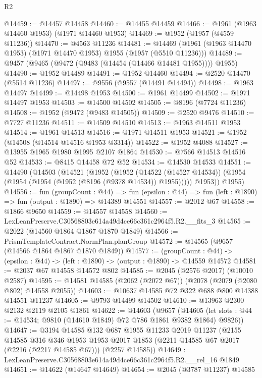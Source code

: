 \begin{lexlean}{R2}
\begin{coremodule}
@14459 := @14457 @14458
@14460 := @14455 @14459
@14466 := @1961 (@1963 @14460 @1953) (@1971 @14460 @1953)
@14469 := @1952 (@1957 (@4559 @11236))
@14470 := @4563 @11236
@14481 := @14469 (@1961 (@1963 @14470 @1953) (@1971 @14470 @1953) @1955 (@1957 (@5510 @11236)))
@14489 := @9457 (@9465 (@9472 (@9483 (@14454 (@14466 @14481 @1955)))) @1955)
@14490 := @1952 @14489
@14491 := @1952 @14460
@14494 := @2520 @14470 (@5514 @11236)
@14497 := @9556 (@9557 (@14491 @14494))
@14498 := @1963 @14497
@14499 := @14498 @1953
@14500 := @1961 @14499
@14502 := @1971 @14497 @1953
@14503 := @14500 @14502
@14505 := @8196 (@7724 @11236)
@14508 := @1952 (@9472 (@9483 @14505))
@14509 := @2520 @9476
@14510 := @7727 @11236
@14511 := @14509 @14510
@14513 := @1963 @14511 @1953
@14514 := @1961 @14513
@14516 := @1971 @14511 @1953
@14521 := @1952 (@14508 (@14514 @14516 @1953 @3314))
@14522 := @1952 @4088
@14527 := @13955 @1965 @1980 @1995 @2107 @1864
@14530 := @7566 @14513 @14516 @52
@14533 := @8415 @14458 @72 @52
@14534 := @14530 @14533
@14551 := @14490
    (@14503
      (@14521
        (@1952
          (@1952
            (@14522 (@14527 @14534))
            (@1954 (@1954 (@1954 (@1952 (@8196 (@9378 @14534)) @1955)))))
          @1953))
      @1955)
@14556 := fun (groupCount : @44) =>
  fun (epsilon : @44) => fun (left : @1890) => fun (output : @1890) => @14389 @14551
@14557 := @2012 @67
@14558 := @1866 @9650
@14559 := @14557 @14558
@14560 := LexLeanPreserve.C30568803e614a49d4ce66c361c2964f5.R2.__fits_3
@14565 := @2022 (@14560 @1864 @1867 @1870 @1849)
@14566 := PrismTemplateContract.NormPlan.planGroup
@14572 := @14565 (@9657 (@14566 @1864 @1867 @1870 @1849))
@14577 := (groupCount : @44) ->
  (epsilon : @44) -> (left : @1890) -> (output : @1890) -> @14559 @14572
@14581 := @2037 @67 @14558 @14572 @802
@14585 := @2045 (@2576 @2017) (@10010 @2587)
@14595 := @14581 @14585 (@2062 (@2072 @67)) (@2078 (@2079 (@2080 @802) @14558 @2055))
@14603 := @10637 @14585 @72 @322 @688 @800 @14388 @14551 @11237
@14605 := @9793 @14499 @14502
@14610 := @13963 @2300 @2132 @2119 @2105 @1861
@14622 := @14603
    (@9657
      (@14605 (let slots : @44 := @14534; @9810 (@14610 @1849) @72 @786 @1861 @9382 @1864) @9826))
@14647 := @3194
    @14585
    @132
    @687
    @1955
    @11233
    @2019
    @11237
    (@2155
      @14585
      @316
      @346
      @1953
      @1953
      @2017
      @1853
      (@2211 @14585 @67 @2017 (@2216 (@2217 @14585 @67)))
      (@2257 @14585))
@14649 := LexLeanPreserve.C30568803e614a49d4ce66c361c2964f5.R2.__rel_16 @1849
@14651 := @14622 (@14647 @14649)
@14654 := @2045 (@3787 @11237) @14585

\end{coremodule}
\end{lexlean}
